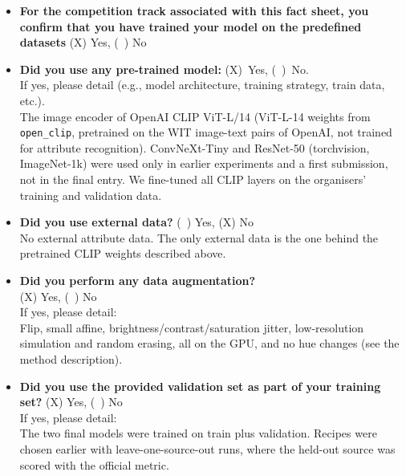 \documentclass[a4paper, 10pt, conference]{ieeeconf}
\begin{document}
%
%
\begin{itemize}
\item \textbf{For the competition track associated with this fact sheet, you confirm that you have trained your model on the predefined datasets} (X) Yes, (~) No\\

\item \textbf{Did you use any pre-trained model:} (X)~Yes, (~)~No.\\ If yes, please detail (e.g., model architecture, training strategy, train data, etc.).\\
The image encoder of OpenAI CLIP ViT-L/14 (ViT-L-14 weights from \texttt{open\_clip}, pretrained on the WIT image-text pairs of OpenAI, not trained for attribute recognition). ConvNeXt-Tiny and ResNet-50 (torchvision, ImageNet-1k) were used only in earlier experiments and a first submission, not in the final entry. We fine-tuned all CLIP layers on the organisers' training and validation data.

\item \textbf{Did you use external data?} (~) Yes, (X) No\\
No external attribute data. The only external data is the one behind the pretrained CLIP weights described above.

\item \textbf{Did you perform any data augmentation?} \\(X) Yes, (~) No\\
If yes, please detail:\\
Flip, small affine, brightness/contrast/saturation jitter, low-resolution simulation and random erasing, all on the GPU, and no hue changes (see the method description).

\item \textbf{Did you use the provided validation set as part of your training set?} (X) Yes, (~) No\\
If yes, please detail:\\
The two final models were trained on train plus validation. Recipes were chosen earlier with leave-one-source-out runs, where the held-out source was scored with the official metric.



\end{itemize}
\end{document}
